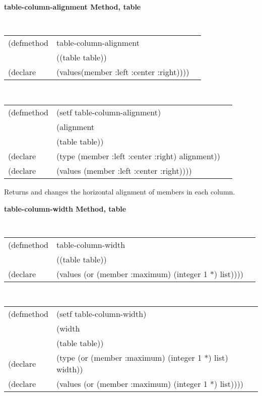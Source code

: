 {\samepage
{\large {\bf table-column-alignment \hfill Method, table}}
\begin{flushright} \parbox[t]{6.125in}{
\tt
\begin{tabular}{lll}
\raggedright
(defmethod & table-column-alignment & \\
& ((table  table)) \\
(declare & (values(member :left :center :right))))
\end{tabular}
\rm

}\end{flushright}}

{\samepage
\begin{flushright} \parbox[t]{6.125in}{
\tt
\begin{tabular}{lll}
\raggedright
(defmethod & (setf table-column-alignment) & \\
         & (alignment \\
         & (table table)) \\
(declare &(type (member :left :center :right)  alignment))\\
(declare & (values (member :left :center :right))))
\end{tabular}
\rm
}
\end{flushright}}


\begin{flushright} \parbox[t]{6.125in}{
Returns and changes the horizontal alignment of members in each column.

}\end{flushright}

	  
{\samepage
{\large {\bf table-column-width \hfill Method, table}}
\begin{flushright} \parbox[t]{6.125in}{
\tt
\begin{tabular}{lll}
\raggedright
(defmethod & table-column-width & \\
& ((table  table)) \\
(declare & (values (or (member :maximum) (integer 1 *) list))))
\end{tabular}
\rm

}\end{flushright}}

{\samepage
\begin{flushright} \parbox[t]{6.125in}{
\tt
\begin{tabular}{lll}
\raggedright
(defmethod & (setf table-column-width) & \\
         & (width \\
         & (table table)) \\
(declare &(type (or (member :maximum) (integer 1 *) list)  width))\\
(declare & (values (or (member :maximum) (integer 1 *) list))))
\end{tabular}
\rm
}
\end{flushright}}


